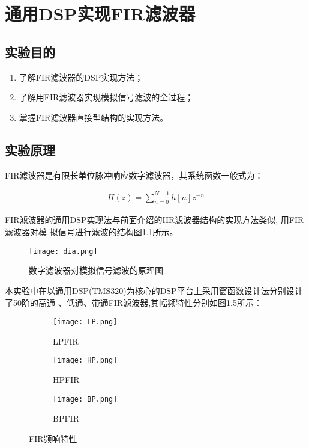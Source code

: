 \documentclass[../main]{subfiles}
\begin{document}
\chapter{通用DSP实现FIR滤波器}%
\label{cha:通用DSP实现FIR滤波器}

\section{实验目的}%
\label{sec:\arabic{chapter}实验目的}

\begin{enumerate}

	\item 了解FIR滤波器的DSP实现方法；

	\item 了解用FIR滤波器实现模拟信号滤波的全过程；

	\item 掌握FIR滤波器直接型结构的实现方法。

\end{enumerate}

\section{实验原理}%
\label{sec:\arabic{chapter}实验原理}

FIR滤波器是有限长单位脉冲响应数字滤波器，其系统函数一般式为：

\begin{align}
	H(z) = \sum\limits_{n=0}^{N-1}h\left[n\right]z^{-n}
\end{align}

FIR滤波器的通用DSP实现法与前面介绍的IIR滤波器结构的实现方法类似, 用FIR滤波器对模
拟信号进行滤波的结构图\ref{fig:数字滤波器对模拟信号滤波的原理图}所示。

\begin{figure}[htbp]
	\centering
	\texttt{[image: dia.png]}
	\caption{数字滤波器对模拟信号滤波的原理图}
	\label{fig:数字滤波器对模拟信号滤波的原理图}
\end{figure}

本实验中在以通用DSP(TMS320)为核心的DSP平台上采用窗函数设计法分别设计了50阶的高通
、低通、带通FIR滤波器,其幅频特性分别如图\ref{fig:FIR频响特性}所示：

\begin{figure}[htbp]
	\centering
	\begin{subfigure}[htbp]{.45\linewidth}
		\centering
		\texttt{[image: LP.png]}
		\caption{LPFIR}
		\label{fig:LPFIR}
	\end{subfigure}
	\quad
	\begin{subfigure}[htbp]{.45\linewidth}
		\centering
		\texttt{[image: HP.png]}
		\caption{HPFIR}
		\label{fig:HPFIR}
	\end{subfigure}

	\begin{subfigure}[htbp]{.45\linewidth}
		\centering
		\texttt{[image: BP.png]}
		\caption{BPFIR}
		\label{fig:BPFIR}
	\end{subfigure}
	\caption{FIR频响特性}
	\label{fig:FIR频响特性}
\end{figure}
\end{document}

